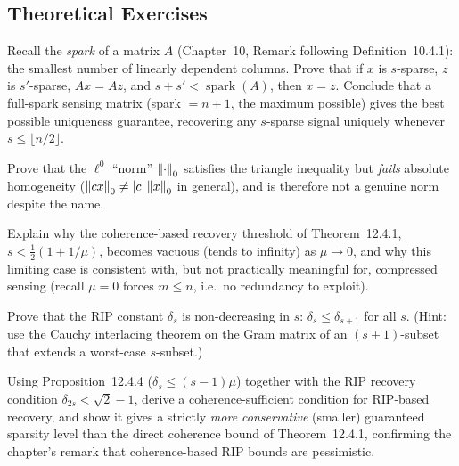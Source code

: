 \subsection*{Theoretical Exercises}
\begin{theoexercises}
	\item Recall the \emph{spark} of a matrix $A$ (Chapter~10, Remark
	following Definition~10.4.1): the smallest number of linearly
	dependent columns. Prove that if $x$ is $s$-sparse, $z$ is
	$s'$-sparse, $Ax=Az$, and $s+s'<\operatorname{spark}(A)$, then
	$x=z$. Conclude that a full-spark sensing matrix (spark $=n+1$,
	the maximum possible) gives the best possible uniqueness
	guarantee, recovering any $s$-sparse signal uniquely whenever
	$s\le\lfloor n/2\rfloor$.
	
	\item Prove that the $\ell^0$ ``norm'' $\left\| \cdot \right\|_0$ satisfies the
	triangle inequality but \emph{fails} absolute homogeneity
	($\left\| cx \right\|_0\ne|c|\left\| x \right\|_0$ in general), and is therefore not
	a genuine norm despite the name.
	
	\item Explain why the coherence-based recovery threshold of
	Theorem~12.4.1, $s<\tfrac12(1+1/\mu)$, becomes vacuous (tends to
	infinity) as $\mu\to0$, and why this limiting case is consistent
	with, but not practically meaningful for, compressed sensing
	(recall $\mu=0$ forces $m\le n$, i.e.\ no redundancy to exploit).
	
	\item Prove that the RIP constant $\delta_s$ is non-decreasing in $s$:
	$\delta_s\le\delta_{s+1}$ for all $s$. (Hint: use the Cauchy
	interlacing theorem on the Gram matrix of an $(s+1)$-subset that
	extends a worst-case $s$-subset.)
	
	\item Using Proposition~12.4.4 ($\delta_s\le(s-1)\mu$) together with the
	RIP recovery condition $\delta_{2s}<\sqrt2-1$, derive a
	coherence-sufficient condition for RIP-based recovery, and show
	it gives a strictly \emph{more conservative} (smaller) guaranteed
	sparsity level than the direct coherence bound of Theorem~12.4.1,
	confirming the chapter's remark that coherence-based RIP bounds
	are pessimistic.
\end{theoexercises}


